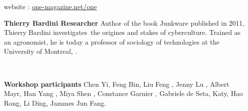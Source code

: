 website : \href{http://one-magazine.net/one/}{one-magazine.net/one}


\bigskip

\textbf{Thierry Bardini Researcher\newline
}Author of the book Junkware published in 2011, Thierry Bardini
investigates~the origines and stakes of cyberculture.\newline
Trained as an agronomist, he is today a professor of sociology of
technologies at the University of Montreal, .

~

\textbf{Workshop participants}
Chen Yi, Feng Bin, Liu Feng , Jenny Lu , Albert Mayr, Han Yang , Miya Shen , Constance Garnier , Gabriele de Seta, Katy, Hao Rong, Li Ding, Jammes Jun Fang.


